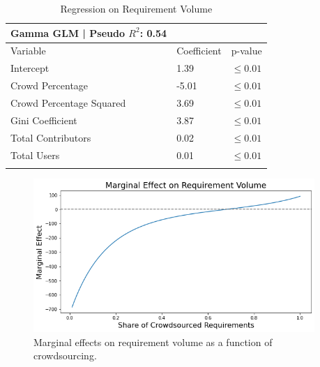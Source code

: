 \begin{table}
\caption{Regression on Requirement Volume}
\label{requirement_volume_regression}
\begin{tabular}{lll}
Gamma GLM | Pseudo $R^2$: 0.54 \\
\hline\noalign{\smallskip}
Variable & Coefficient & p-value  \\
\noalign{\smallskip}\hline\noalign{\smallskip}
Intercept & 1.39 & $\leq 0.01$ \\
Crowd Percentage &  -5.01 & $\leq 0.01$  \\
Crowd Percentage Squared & 3.69 & $\leq 0.01$  \\
Gini Coefficient & 3.87 & $\leq 0.01$  \\
Total Contributors & 0.02 & $\leq 0.01$ \\
Total Users & 0.01 & $\leq 0.01$ \\
\noalign{\smallskip}\hline
\end{tabular}
\end{table}

\begin{figure}
  \includegraphics[width=0.95\textwidth]{issue_volume_marginal.PNG}
\caption{Marginal effects on requirement volume as a function of crowdsourcing.}
\label{requirement_volume_marginal}
\end{figure}

